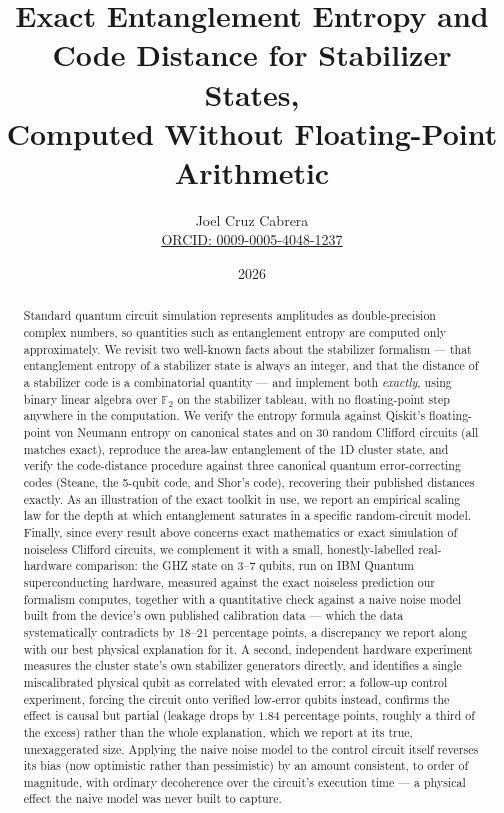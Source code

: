 \documentclass[11pt]{article}
\title{Exact Entanglement Entropy and Code Distance for Stabilizer States,\\
Computed Without Floating-Point Arithmetic}
\author{Joel Cruz Cabrera \\ \href{https://orcid.org/0009-0005-4048-1237}{ORCID: 0009-0005-4048-1237}}
\date{2026}
\newcommand{\GF}{\mathbb{F}_2}
\begin{document}
\maketitle

\begin{abstract}
Standard quantum circuit simulation represents amplitudes as
double-precision complex numbers, so quantities such as entanglement
entropy are computed only approximately. We revisit two well-known facts
about the stabilizer formalism --- that entanglement entropy of a
stabilizer state is always an integer, and that the distance of a
stabilizer code is a combinatorial quantity --- and implement both
\emph{exactly}, using binary linear algebra over $\GF$ on the stabilizer
tableau, with no floating-point step anywhere in the computation. We
verify the entropy formula against Qiskit's floating-point von Neumann
entropy on canonical states and on 30 random Clifford circuits (all
matches exact), reproduce the area-law entanglement of the 1D cluster
state, and verify the code-distance procedure against three canonical
quantum error-correcting codes (Steane, the 5-qubit code, and Shor's
code), recovering their published distances exactly. As an illustration
of the exact toolkit in use, we report an empirical scaling law for the
depth at which entanglement saturates in a specific random-circuit
model. Finally, since every result above concerns exact mathematics or
exact simulation of noiseless Clifford circuits, we complement it with a
small, honestly-labelled real-hardware comparison: the GHZ state on
$3$--$7$ qubits, run on IBM Quantum superconducting hardware, measured
against the exact noiseless prediction our formalism computes, together
with a quantitative check against a naive noise model built from the
device's own published calibration data --- which the data
systematically contradicts by 18--21 percentage points, a discrepancy we
report along with our best physical explanation for it. A second,
independent hardware experiment measures the cluster state's own
stabilizer generators directly, and identifies a single miscalibrated
physical qubit as correlated with elevated error; a follow-up control
experiment, forcing the circuit onto verified low-error qubits instead,
confirms the effect is causal but partial (leakage drops by $1.84$
percentage points, roughly a third of the excess) rather than the whole
explanation, which we report at its true, unexaggerated size. Applying
the naive noise model to the control circuit itself reverses its bias
(now optimistic rather than pessimistic) by an amount consistent, to
order of magnitude, with ordinary decoherence over the circuit's
execution time --- a physical effect the naive model was never built to
capture.
\end{abstract}
\end{document}
